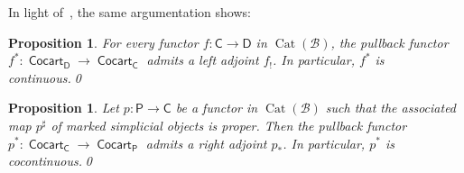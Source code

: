 \documentclass[reqno]{amsart}
\numberwithin{equation}{subsection}
\theoremstyle{plain}
\newtheorem{proposition}[equation]{Proposition}
\theoremstyle{definition}
\let\scr=\mathcal
\def\BB{\scr B}
\DeclareMathOperator{\Cat}{Cat}
\DeclareMathOperator{\ICocart}{\mathsf{Cocart}}
\newcommand{\I}[1]{\mathsf{#1}}
\begin{document}
In light of~\cite[Proposition~3.2.8]{Martini2021a}, the same argumentation shows:
\begin{proposition}
	\label{prop:CocartBaseChangeLeftAdjoint}
	For every functor $f\colon \I{C}\to\I{D}$ in $\Cat(\BB)$, the pullback functor $f^\ast\colon \ICocart_{\I{D}}\to\ICocart_{\I{C}}$ admits a left adjoint $f_!$. In particular, $f^\ast$ is continuous.\qed
\end{proposition}

\begin{proposition}
	\label{prop:CocartBaseChangeRightAdjoint}
	Let $p\colon \I{P}\to\I{C}$ be a functor in $\Cat(\BB)$ such that the associated map $p^\sharp$ of marked simplicial objects is proper. Then the pullback functor $p^\ast\colon \ICocart_{\I{C}}\to\ICocart_{\I{P}}$ admits a right adjoint $p_\ast$. In particular, $p^\ast$ is cocontinuous.\qed
\end{proposition}
\end{document}
